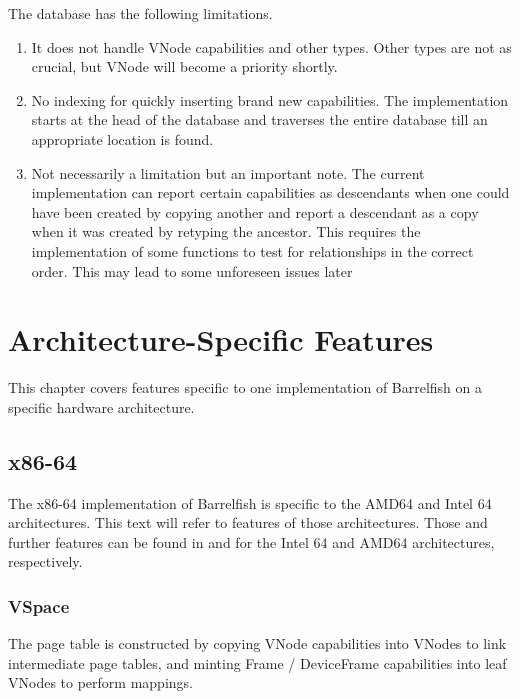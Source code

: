\documentclass{scrreprt}
\begin{document}
  The database has the following limitations.
  \begin{enumerate}
  \item It does not handle VNode capabilities and other types.
    Other types are not as crucial, but VNode will become a priority shortly.

  \item No indexing for quickly inserting brand new capabilities.
    The implementation starts at the head of the database
    and traverses the entire database till an appropriate location is found.

  \item Not necessarily a limitation but an important note.
    The current implementation can report certain capabilities as descendants
    when one could have been created by copying another
    and report a descendant as a copy when it was created by retyping the ancestor.
    This requires the implementation of some functions to test for relationships
    in the correct order.
    This may lead to some unforeseen issues later
  \end{enumerate}

  \chapter{Architecture-Specific Features}\label{apx:arch_specific}

  This chapter covers features specific to one implementation of
  Barrelfish on a specific hardware architecture.

  \section{x86-64}

    The x86-64 implementation of Barrelfish is specific to the AMD64
    and Intel 64 architectures. This text will refer to features of
    those architectures. Those and further features can be found in
    \cite{intelsa} and \cite{amdsa} for the Intel 64 and AMD64
    architectures, respectively.

    \subsection{VSpace}

    The page table is constructed by copying VNode capabilities into VNodes to
    link intermediate page tables, and minting Frame / DeviceFrame capabilities 
    into leaf VNodes to perform mappings.
\end{document}
